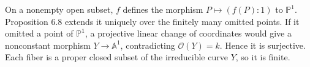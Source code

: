 On a nonempty open subset, $f$ defines the morphism $P\mapsto(f(P):1)$ to $\mathbb{P}^1$. Proposition 6.8 extends it uniquely over the finitely many omitted points. If it omitted a point of $\mathbb{P}^1$, a projective linear change of coordinates would give a nonconstant morphism $Y\to\mathbb{A}^1$, contradicting $\mathcal O(Y)=k$. Hence it is surjective. Each fiber is a proper closed subset of the irreducible curve $Y$, so it is finite.
